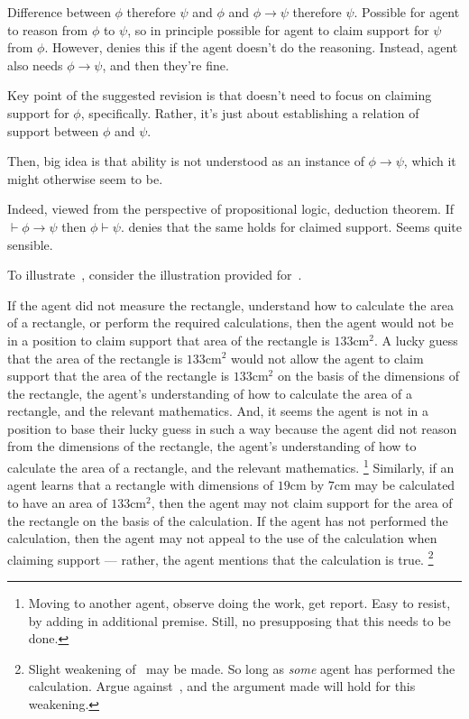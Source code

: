 \begin{note}[Simplest]
  \color{red}
  Difference between \(\phi\) therefore \(\psi\) and \(\phi\) and \(\phi \rightarrow \psi\) therefore \(\psi\).
  Possible for agent to reason from \(\phi\) to \(\psi\), so in principle possible for agent to claim support for \(\psi\) from \(\phi\).
  However, \ESU{} denies this if the agent doesn't do the reasoning.
  Instead, agent also needs \(\phi \rightarrow \psi\), and then they're fine.

  Key point of the suggested revision is that \ESU{} doesn't need to focus on claiming support for \(\phi\), specifically.
  Rather, it's just about establishing a relation of support between \(\phi\) and \(\psi\).

  Then, big idea is that ability is not understood as an instance of \(\phi \rightarrow \psi\), which it might otherwise seem to be.

  Indeed, viewed from the perspective of propositional logic, deduction theorem.
  If \(\vdash \phi \rightarrow \psi\) then \(\phi \vdash \psi\).
  \ESU{} denies that the same holds for claimed support.
  Seems quite sensible.
\end{note}

\begin{note}[Illustration]
  To illustrate~\ESU{}, consider the illustration provided for~\USE{}.

    If the agent did not measure the rectangle, understand how to calculate the area of a rectangle, or perform the required calculations, then the agent would not be in a position to claim support that area of the rectangle is \(133\text{cm}^{2}\).
  A lucky guess that the area of the rectangle is \(133\text{cm}^{2}\) would not allow the agent to claim support that the area of the rectangle is  \(133\text{cm}^{2}\) on the basis of the dimensions of the rectangle, the agent's understanding of how to calculate the area of a rectangle, and the relevant mathematics.
  And, it seems the agent is not in a position to base their lucky guess in such a way because the agent did not reason from the dimensions of the rectangle, the agent's understanding of how to calculate the area of a rectangle, and the relevant mathematics.\nolinebreak
  \footnote{
    Moving to another agent, observe doing the work, get report.
    Easy to resist, by adding in additional premise.
    Still, no presupposing that this needs to be done.
  }
  Similarly, if an agent learns that a rectangle with dimensions of \(19\text{cm}\) by \(7\text{cm}\) may be calculated to have an area of \(133\text{cm}^{2}\), then the agent may not claim support for the area of the rectangle on the basis of the calculation.
  If the agent has not performed the calculation, then the agent may not appeal to the use of the calculation when claiming support --- rather, the agent mentions that the calculation is true.\nolinebreak
  \footnote{
    Slight weakening of~\ESU{} may be made.
    So long as \emph{some} agent has performed the calculation.
    Argue against~\ESU{}, and the argument made will hold for this weakening.
  }
\end{note}

